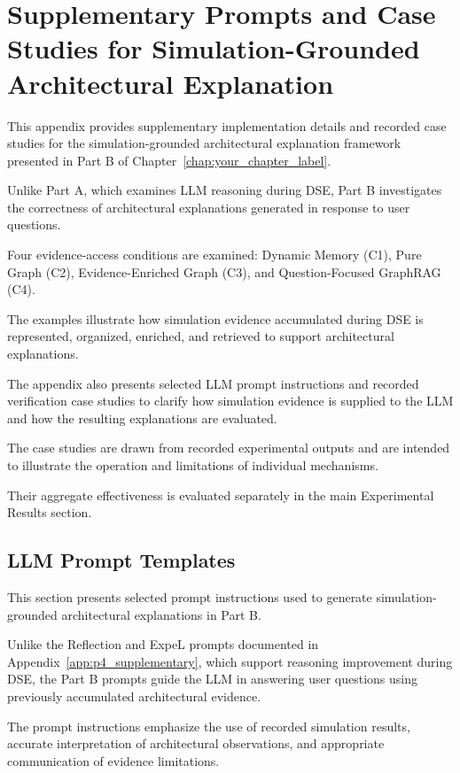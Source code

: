 
\chapter{Supplementary Prompts and Case Studies for
Simulation-Grounded Architectural Explanation}
\label{app:p5_supplementary}

This appendix provides supplementary
implementation details and recorded
case studies for the simulation-grounded
architectural explanation framework
presented in Part B of
Chapter~\ref{chap:your_chapter_label}.

Unlike Part A, which examines
LLM reasoning during DSE,
Part B investigates the correctness
of architectural explanations
generated in response to user questions.

Four evidence-access conditions
are examined: Dynamic Memory (C1),
Pure Graph (C2), Evidence-Enriched
Graph (C3), and Question-Focused
GraphRAG (C4).

The examples illustrate how
simulation evidence accumulated
during DSE is represented,
organized, enriched, and retrieved
to support architectural explanations.

The appendix also presents selected
LLM prompt instructions and recorded
verification case studies to clarify
how simulation evidence is supplied
to the LLM and how the resulting
explanations are evaluated.

The case studies are drawn from
recorded experimental outputs and
are intended to illustrate the
operation and limitations of
individual mechanisms.

Their aggregate effectiveness
is evaluated separately in the
main Experimental Results section.



\section{LLM Prompt Templates}
\label{app:p5_prompts}

This section presents selected
prompt instructions used to generate
simulation-grounded architectural
explanations in Part B.

Unlike the Reflection and ExpeL
prompts documented in
Appendix~\ref{app:p4_supplementary},
which support reasoning improvement
during DSE, the Part B prompts
guide the LLM in answering user
questions using previously
accumulated architectural evidence.

The prompt instructions emphasize
the use of recorded simulation
results, accurate interpretation
of architectural observations,
and appropriate communication
of evidence limitations.

